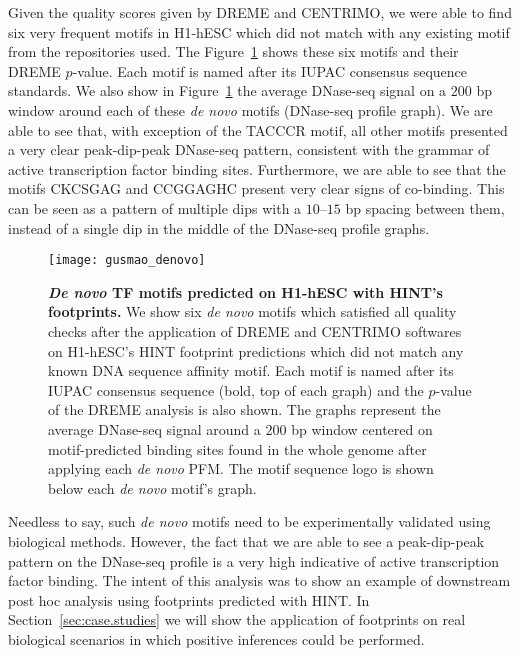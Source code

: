 Given the quality scores given by DREME and CENTRIMO, we were able to find six very frequent motifs in H1-hESC which did not match with any existing motif from the repositories used. The Figure~\ref{fig:gusmao_denovo} shows these six motifs and their DREME $p$-value. Each motif is named after its IUPAC consensus sequence standards. We also show in Figure~\ref{fig:gusmao_denovo} the average DNase-seq signal on a $200$ bp window around each of these \emph{de novo} motifs (DNase-seq profile graph). We are able to see that, with exception of the TACCCR motif, all other motifs presented a very clear peak-dip-peak DNase-seq pattern, consistent with the grammar of active transcription factor binding sites. Furthermore, we are able to see that the motifs CKCSGAG and CCGGAGHC present very clear signs of co-binding. This can be seen as a pattern of multiple dips with a $10$--$15$ bp spacing between them, instead of a single dip in the middle of the DNase-seq profile graphs.

\begin{figure}[h!]
\centering
\texttt{[image: gusmao\_denovo]}
\caption[\emph{De novo} TF motifs predicted on H1-hESC with HINT's footprints]{\textbf{\emph{De novo} TF motifs predicted on H1-hESC with HINT's footprints.} We show six \emph{de novo} motifs which satisfied all quality checks after the application of DREME and CENTRIMO softwares on H1-hESC's HINT footprint predictions which did not match any known DNA sequence affinity motif. Each motif is named after its IUPAC consensus sequence (bold, top of each graph) and the $p$-value of the DREME analysis is also shown. The graphs represent the average DNase-seq signal around a $200$ bp window centered on motif-predicted binding sites found in the whole genome after applying each \emph{de novo} PFM. The motif sequence logo is shown below each \emph{de novo} motif's graph.}
\label{fig:gusmao_denovo}
\end{figure}

Needless to say, such \emph{de novo} motifs need to be experimentally validated using biological methods. However, the fact that we are able to see a peak-dip-peak pattern on the DNase-seq profile is a very high indicative of active transcription factor binding. The intent of this analysis was to show an example of downstream post hoc analysis using footprints predicted with HINT. In Section~\ref{sec:case.studies} we will show the application of footprints on real biological scenarios in which positive inferences could be performed.

























